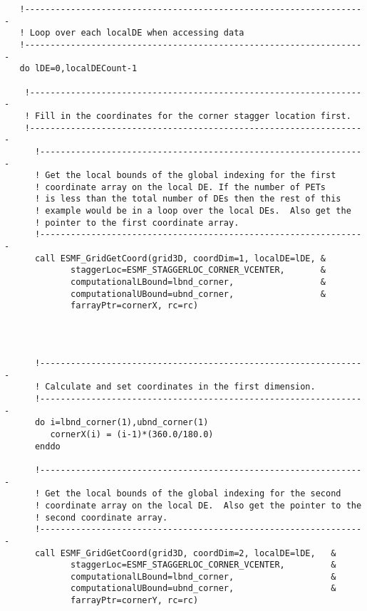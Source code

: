  \begin{verbatim}



   !-------------------------------------------------------------------
   ! Loop over each localDE when accessing data
   !-------------------------------------------------------------------
   do lDE=0,localDECount-1

    !------------------------------------------------------------------
    ! Fill in the coordinates for the corner stagger location first.
    !------------------------------------------------------------------
      !----------------------------------------------------------------
      ! Get the local bounds of the global indexing for the first
      ! coordinate array on the local DE. If the number of PETs
      ! is less than the total number of DEs then the rest of this
      ! example would be in a loop over the local DEs.  Also get the
      ! pointer to the first coordinate array.
      !----------------------------------------------------------------
      call ESMF_GridGetCoord(grid3D, coordDim=1, localDE=lDE, &
             staggerLoc=ESMF_STAGGERLOC_CORNER_VCENTER,       &
             computationalLBound=lbnd_corner,                 &
             computationalUBound=ubnd_corner,                 &
             farrayPtr=cornerX, rc=rc)
 
\end{verbatim}
 

 \begin{verbatim}


      !----------------------------------------------------------------
      ! Calculate and set coordinates in the first dimension.
      !----------------------------------------------------------------
      do i=lbnd_corner(1),ubnd_corner(1)
         cornerX(i) = (i-1)*(360.0/180.0)
      enddo

      !----------------------------------------------------------------
      ! Get the local bounds of the global indexing for the second
      ! coordinate array on the local DE.  Also get the pointer to the
      ! second coordinate array.
      !----------------------------------------------------------------
      call ESMF_GridGetCoord(grid3D, coordDim=2, localDE=lDE,   &
             staggerLoc=ESMF_STAGGERLOC_CORNER_VCENTER,         &
             computationalLBound=lbnd_corner,                   &
             computationalUBound=ubnd_corner,                   &
             farrayPtr=cornerY, rc=rc)
 
\end{verbatim}
 
